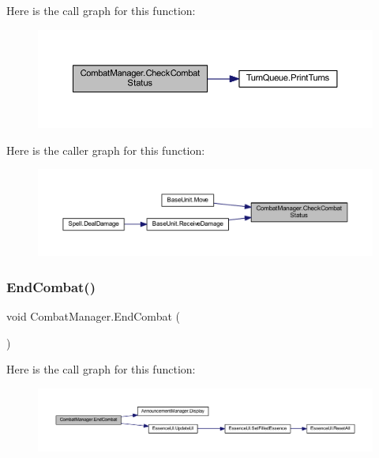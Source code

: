 Here is the call graph for this function\+:
\nopagebreak
\begin{figure}[H]
\begin{center}
\leavevmode
\includegraphics[width=350pt]{class_combat_manager_aea6dfda807c4ec793ed26c5d220b84fb_cgraph}
\end{center}
\end{figure}
Here is the caller graph for this function\+:
\nopagebreak
\begin{figure}[H]
\begin{center}
\leavevmode
\includegraphics[width=350pt]{class_combat_manager_aea6dfda807c4ec793ed26c5d220b84fb_icgraph}
\end{center}
\end{figure}
\mbox{\label{class_combat_manager_a8d14cf9a8265e20264151a615e309f12}} 
\subsubsection{\texorpdfstring{EndCombat()}{EndCombat()}}
{\footnotesize\ttfamily void Combat\+Manager.\+End\+Combat (\begin{DoxyParamCaption}{ }\end{DoxyParamCaption})}

Here is the call graph for this function\+:
\nopagebreak
\begin{figure}[H]
\begin{center}
\leavevmode
\includegraphics[width=350pt]{class_combat_manager_a8d14cf9a8265e20264151a615e309f12_cgraph}
\end{center}
\end{figure}
\mbox{\label{class_combat_manager_ae306deb3898e096bf5ad6cdd705b82fa}} 
